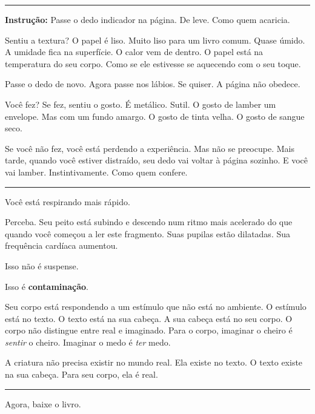 \vspace{0.5em}\noindent\rule{\textwidth}{0.5pt}\vspace{0.5em}

\noindent \textbf{Instrução:} Passe o dedo indicador na página. De leve. Como quem acaricia.

\noindent Sentiu a textura? O papel é liso. Muito liso para um livro comum. Quase úmido. A umidade fica na superfície. O calor vem de dentro. O papel está na temperatura do seu corpo. Como se ele estivesse se aquecendo com o seu toque.

\noindent Passe o dedo de novo. Agora passe nos lábios. Se quiser. A página não obedece.

\noindent Você fez? Se fez, sentiu o gosto. É metálico. Sutil. O gosto de lamber um envelope. Mas com um fundo amargo. O gosto de tinta velha. O gosto de sangue seco.

\noindent Se você não fez, você está perdendo a experiência. Mas não se preocupe. Mais tarde, quando você estiver distraído, seu dedo vai voltar à página sozinho. E você vai lamber. Instintivamente. Como quem confere.

\vspace{0.5em}\noindent\rule{\textwidth}{0.5pt}\vspace{0.5em}

\noindent Você está respirando mais rápido.

\noindent Perceba. Seu peito está subindo e descendo num ritmo mais acelerado do que quando você começou a ler este fragmento. Suas pupilas estão dilatadas. Sua frequência cardíaca aumentou.

\noindent Isso não é suspense.

\noindent Isso é \textbf{contaminação}.

\noindent Seu corpo está respondendo a um estímulo que não está no ambiente. O estímulo está no texto. O texto está na sua cabeça. A sua cabeça está no seu corpo. O corpo não distingue entre real e imaginado. Para o corpo, imaginar o cheiro é \textit{sentir} o cheiro. Imaginar o medo é \textit{ter} medo.

\noindent A criatura não precisa existir no mundo real.
Ela existe no texto.
O texto existe na sua cabeça.
Para seu corpo, ela é real.

\vspace{0.5em}\noindent\rule{\textwidth}{0.5pt}\vspace{0.5em}

\noindent Agora, baixe o livro.

